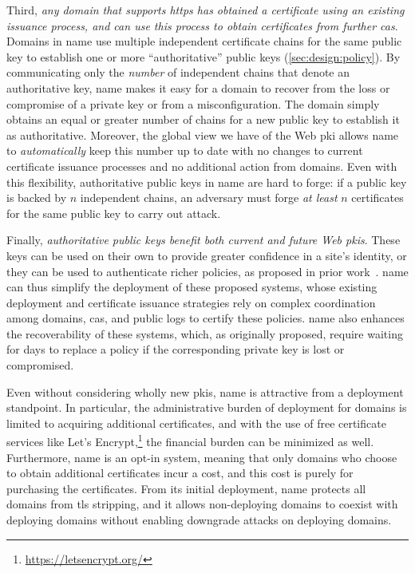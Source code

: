 Third, \emph{any domain that supports \ac{https} has obtained a certificate
using an existing issuance process, and can use this process to obtain
certificates from further \acp{ca}}. Domains in \ac{name} use multiple
independent certificate chains for the same public key to establish one or more
``authoritative'' public keys (\autoref{sec:design:policy}). By communicating
only the \emph{number} of independent chains that denote an authoritative key,
\ac{name} makes it easy for a domain to recover from the loss or compromise of a
private key or from a misconfiguration. The domain simply obtains an equal or
greater number of chains for a new public key to establish it as authoritative.
Moreover, the global view we have of the Web \ac{pki} allows \ac{name} to
\emph{automatically} keep this number up to date with no changes to current
certificate issuance processes and no additional action from domains. Even with
this flexibility, authoritative public keys in \ac{name} are hard to forge: if a
public key is backed by $n$ independent chains, an adversary must forge \emph{at
least} $n$ certificates for the same public key to carry out  attack.

Finally, \emph{authoritative public keys benefit both current and future Web
\acp{pki}}. These keys can be used on their own to provide greater confidence in
a site's identity, or they can be used to authenticate richer policies, as
proposed in prior work~\cite{basin2014arpki, szalachowski2014policert}.
\ac{name} can thus simplify the deployment of these proposed systems, whose
existing deployment and certificate issuance strategies rely on complex
coordination among domains, \acp{ca}, and public logs to certify these policies.
\ac{name} also enhances the recoverability of these systems, which, as
originally proposed, require waiting for days to replace a policy if the
corresponding private key is lost or compromised.

Even without considering wholly new \acp{pki}, \ac{name} is attractive from a
deployment standpoint. In particular, the administrative burden of deployment
for domains is limited to acquiring additional certificates, and with the use of
free certificate services like Let's
Encrypt,\footnote{\url{https://letsencrypt.org/}} the financial burden can be
minimized as well. Furthermore, \ac{name} is an opt-in system, meaning that only
domains who choose to obtain additional certificates incur a cost, and this cost
is purely for purchasing the certificates. From its initial deployment,
\ac{name} protects all domains from \ac{tls} stripping, and it allows
non-deploying domains to coexist with deploying domains without enabling
downgrade attacks on deploying domains.

